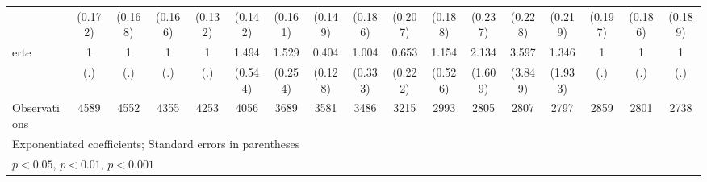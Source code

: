 {\begin{tabular}{l*{16}{c}}
                    &     (0.172)         &     (0.168)         &     (0.166)         &     (0.132)         &     (0.142)         &     (0.161)         &     (0.149)         &     (0.186)         &     (0.207)         &     (0.188)         &     (0.237)         &     (0.228)         &     (0.219)         &     (0.197)         &     (0.186)         &     (0.189)         \\
[1em]
erte                &           1         &           1         &           1         &           1         &       1.494         &       1.529\sym{*}  &       0.404\sym{**} &       1.004         &       0.653         &       1.154         &       2.134         &       3.597         &       1.346         &           1         &           1         &           1         \\
                    &         (.)         &         (.)         &         (.)         &         (.)         &     (0.544)         &     (0.254)         &     (0.128)         &     (0.333)         &     (0.222)         &     (0.526)         &     (1.609)         &     (3.849)         &     (1.933)         &         (.)         &         (.)         &         (.)         \\
\hline
Observations        &        4589         &        4552         &        4355         &        4253         &        4056         &        3689         &        3581         &        3486         &        3215         &        2993         &        2805         &        2807         &        2797         &        2859         &        2801         &        2738         \\
\hline\hline
\multicolumn{17}{l}{\footnotesize Exponentiated coefficients; Standard errors in parentheses}\\
\multicolumn{17}{l}{\footnotesize \sym{*} \(p<0.05\), \sym{**} \(p<0.01\), \sym{***} \(p<0.001\)}\\
\end{tabular}
}
